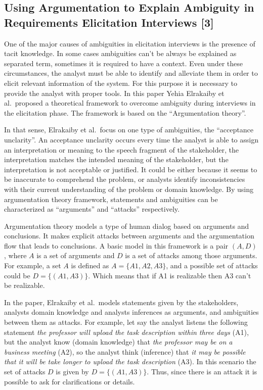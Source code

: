 \documentclass[]{llncs}
\begin{document}
\hypertarget{using-argumentation-to-explain-ambiguity-in-requirements-elicitation-interviews-elrakaiby2017using}{%
\subsection{Using Argumentation to Explain Ambiguity in Requirements
Elicitation Interviews
{[}3{]}}\label{using-argumentation-to-explain-ambiguity-in-requirements-elicitation-interviews-elrakaiby2017using}}

One of the major causes of ambiguities in elicitation interviews is the
presence of tacit knowledge. In some cases ambiguities can't be always
be explained as separated term, sometimes it is required to have a
context. Even under these circumstances, the analyst must be able to
identify and alleviate them in order to elicit relevant information of
the system. For this purpose it is necessary to provide the analyst with
proper tools. In this paper Yehia Elrakaiby et al.~proposed a
theoretical framework to overcome ambiguity during interviews in the
elicitation phase. The framework is based on the ``Argumentation
theory''.

In that sense, Elrakaiby et al.~focus on one type of ambiguities, the
``acceptance unclarity''. An acceptance unclarity occurs every time the
analyst is able to assign an interpretation or meaning to the speech
fragment of the stakeholder, the interpretation matches the intended
meaning of the stakeholder, but the interpretation is not acceptable or
justified. It could be either because it seems to be inaccurate to
comprehend the problem, or analysts identify inconsistencies with their
current understanding of the problem or domain knowledge. By using
argumentation theory framework, statements and ambiguities can be
characterized as ``arguments'' and ``attacks'' respectively.

Argumentation theory models a type of human dialog based on arguments
and conclusions. It makes explicit attacks between arguments and the
argumentation flow that leads to conclusions. A basic model in this
framework is a pair \((A,D)\), where \(A\) is a set of arguments and
\(D\) is a set of attacks among those arguments. For example, a set
\(A\) is defined as \(A = \{A1,A2,A3\}\), and a possible set of attacks
could be \(D = \{(A1,A3)\}\). Which means that if A1 is realizable then
A3 can't be realizable.

In the paper, Elrakaiby et al.~models statements given by the
stakeholders, analysts domain knowledge and analysts inferences as
arguments, and ambiguities between them as attacks. For example, let say
the analyst listens the following statement \emph{the professor will
upload the task description within three days} (A1), but the analyst
know (domain knowledge) that \emph{the professor may be on a business
meeting} (A2), so the analyst think (inference) that \emph{it may be
possible that it will be take longer to upload the task description}
(A3). In this scenario the set of attacks \(D\) is given by
\(D = \{(A1,A3)\}\). Thus, since there is an attack it is possible to
ask for clarifications or details.
\end{document}
